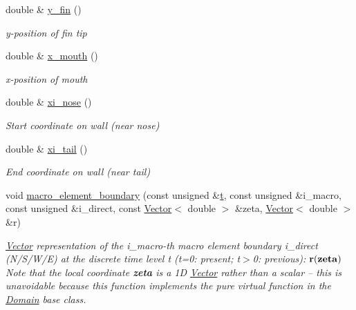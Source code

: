 \begin{DoxyCompactItemize}
double \& \hyperlink{classoomph_1_1FishDomain_ae1a869cee7946b178a09214725e27f29}{y\+\_\+fin} ()
\begin{DoxyCompactList}\small\item\em y-\/position of fin tip \end{DoxyCompactList}\item 
double \& \hyperlink{classoomph_1_1FishDomain_adf87e9ae261cc914173bc18d7eb5bfd8}{x\+\_\+mouth} ()
\begin{DoxyCompactList}\small\item\em x-\/position of mouth \end{DoxyCompactList}\item 
double \& \hyperlink{classoomph_1_1FishDomain_a773b98977806c2b27531425ecf5e3f8e}{xi\+\_\+nose} ()
\begin{DoxyCompactList}\small\item\em Start coordinate on wall (near nose) \end{DoxyCompactList}\item 
double \& \hyperlink{classoomph_1_1FishDomain_ae2bcc0014506ba2225b928f319a27c9d}{xi\+\_\+tail} ()
\begin{DoxyCompactList}\small\item\em End coordinate on wall (near tail) \end{DoxyCompactList}\item 
void \hyperlink{classoomph_1_1FishDomain_a383b0fb396d605932ba6fb0779dacbf9}{macro\+\_\+element\+\_\+boundary} (const unsigned \&\hyperlink{cfortran_8h_af6f0bd3dc13317f895c91323c25c2b8f}{t}, const unsigned \&i\+\_\+macro, const unsigned \&i\+\_\+direct, const \hyperlink{classoomph_1_1Vector}{Vector}$<$ double $>$ \&zeta, \hyperlink{classoomph_1_1Vector}{Vector}$<$ double $>$ \&r)
\begin{DoxyCompactList}\small\item\em \hyperlink{classoomph_1_1Vector}{Vector} representation of the i\+\_\+macro-\/th macro element boundary i\+\_\+direct (N/\+S/\+W/E) at the discrete time level t (t=0\+: present; t$>$0\+: previous)\+: $ {\bf r}({\bf zeta}) $ Note that the local coordinate {\bfseries zeta} is a 1D \hyperlink{classoomph_1_1Vector}{Vector} rather than a scalar -- this is unavoidable because this function implements the pure virtual function in the \hyperlink{classoomph_1_1Domain}{Domain} base class. \end{DoxyCompactList}\end{DoxyCompactItemize}
